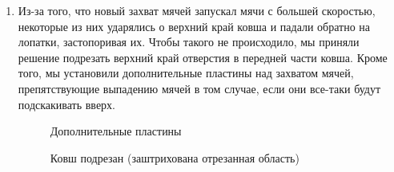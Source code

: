 \begin{enumerate}
	\item Из-за того, что новый захват мячей запускал мячи с большей скоростью, некоторые из них ударялись о верхний край ковша и падали обратно на лопатки, застопоривая их. Чтобы такого не происходило, мы приняли решение подрезать верхний край отверстия в передней части ковша. Кроме того, мы установили дополнительные пластины над захватом мячей, препятствующие выпадению мячей в том случае, если они все-таки будут подскакивать вверх.
	\begin{figure}[H]
		\begin{minipage}[h]{0.47\linewidth}
			\caption{Дополнительные пластины}
		\end{minipage}
		\hfill
		\begin{minipage}[h]{0.47\linewidth}
			\caption{Ковш подрезан (заштрихована отрезанная область)}
		\end{minipage}
	\end{figure}
	

\end{enumerate}
